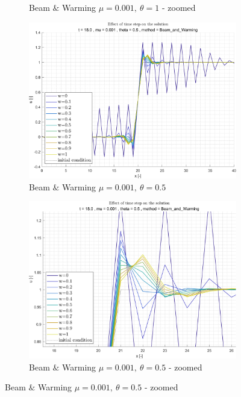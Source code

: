 \documentclass[11pt, a4paper]{article}
\begin{document}
\begin{figure}[H]
\begin{subfigure}[c]{.38\textwidth}
        \caption{Beam $\&$ Warming $\mu=0.001,\ \theta=1$ - zoomed}
        \label{fig:Beam & Warming_general_mu0.001_theta1_B_diff_w}
    \end{subfigure}
    \begin{subfigure}[c]{.38\textwidth}
        \centering
        \includegraphics[width=\textwidth]{images/grap17.png}
        \caption{Beam $\&$ Warming $\mu=0.001,\ \theta=0.5$}
        \label{fig:Beam & Warming_general_mu0.001_theta0.5_A_diff_w}
    \end{subfigure}
    \begin{subfigure}[c]{.38\textwidth}
        \centering
        \includegraphics[width=\textwidth]{images/grap17.1.png}
        \caption{Beam $\&$ Warming $\mu=0.001,\ \theta=0.5$ - zoomed}

\end{subfigure}
\end{figure}
\end{document}
